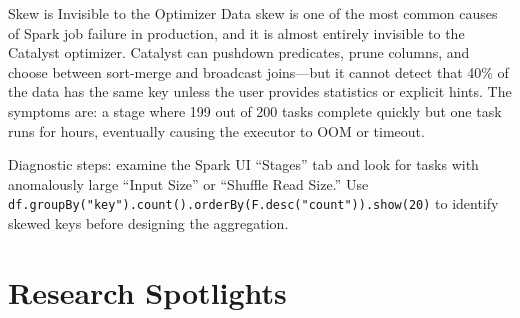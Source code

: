 \begin{techdebt}{Skew is Invisible to the Optimizer}
Data skew is one of the most common causes of Spark job failure in
production, and it is almost entirely invisible to the Catalyst optimizer.
Catalyst can pushdown predicates, prune columns, and choose between sort-merge
and broadcast joins---but it cannot detect that 40\% of the data has the
same key unless the user provides statistics or explicit hints. The symptoms
are: a stage where 199 out of 200 tasks complete quickly but one task runs
for hours, eventually causing the executor to OOM or timeout.

Diagnostic steps: examine the Spark UI ``Stages'' tab and look for tasks with
anomalously large ``Input Size'' or ``Shuffle Read Size.'' Use
\texttt{df.groupBy("key").count().orderBy(F.desc("count")).show(20)} to identify
skewed keys before designing the aggregation.
\end{techdebt}

\section{Research Spotlights}
\label{sec:ch6-research}

